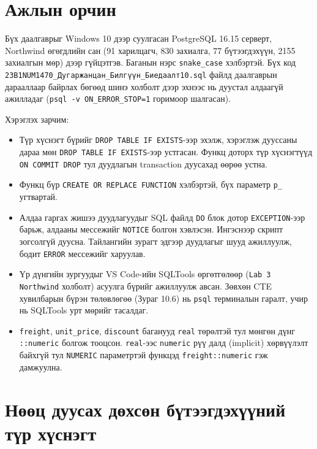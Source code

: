 \documentclass[11pt,a4paper]{article}
\newcommand{\id}[1]{\texttt{#1}}
\begin{document}
\clearpage
\section*{Ажлын орчин}

Бүх даалгаврыг Windows 10 дээр суулгасан PostgreSQL 16.15 серверт, Northwind өгөгдлийн сан (91 харилцагч, 830 захиалга, 77 бүтээгдэхүүн, 2155 захиалгын мөр) дээр гүйцэтгэв. Баганын нэрс \id{snake\_case} хэлбэртэй. Бүх код \id{23B1NUM1470\_Дугаржанцан\_Билгүүн\_Биедаалт10.sql} файлд даалгаврын дарааллаар байрлах бөгөөд шинэ холболт дээр эхнээс нь дуустал алдаагүй ажилладаг (\id{psql -v ON\_ERROR\_STOP=1} горимоор шалгасан).

Хэрэглэх зарчим:
\begin{itemize}
  \item Түр хүснэгт бүрийг \id{DROP TABLE IF EXISTS}-ээр эхэлж, хэрэглэж дууссаны дараа мөн \id{DROP TABLE IF EXISTS}-ээр устгасан. Функц доторх түр хүснэгтүүд \id{ON COMMIT DROP} тул дуудлагын transaction дуусахад өөрөө устна.
  \item Функц бүр \id{CREATE OR REPLACE FUNCTION} хэлбэртэй, бүх параметр \id{p\_} угтвартай.
  \item Алдаа гаргах жишээ дуудлагуудыг SQL файлд \id{DO} блок дотор \id{EXCEPTION}-ээр барьж, алдааны мессежийг \id{NOTICE} болгон хэвлэсэн. Ингэснээр скрипт зогсолгүй дуусна. Тайлангийн зурагт эдгээр дуудлагыг шууд ажиллуулж, бодит \id{ERROR} мессежийг харуулав.
  \item Үр дүнгийн зургуудыг VS Code-ийн SQLTools өргөтгөлөөр (\id{Lab 3 Northwind} холболт) асуулга бүрийг ажиллуулж авсан. Зөвхөн CTE хувилбарын бүрэн төлөвлөгөө (Зураг 10.6) нь \id{psql} терминалын гаралт, учир нь SQLTools урт мөрийг тасалдаг.
  \item \id{freight}, \id{unit\_price}, \id{discount} баганууд \id{real} төрөлтэй тул мөнгөн дүнг \id{::numeric} болгож тооцсон. \id{real}-ээс \id{numeric} рүү далд (implicit) хөрвүүлэлт байхгүй тул \id{NUMERIC} параметртэй функцэд \id{freight::numeric} гэж дамжуулна.
\end{itemize}

\clearpage
\section{Нөөц дуусах дөхсөн бүтээгдэхүүний түр хүснэгт}
\end{document}

